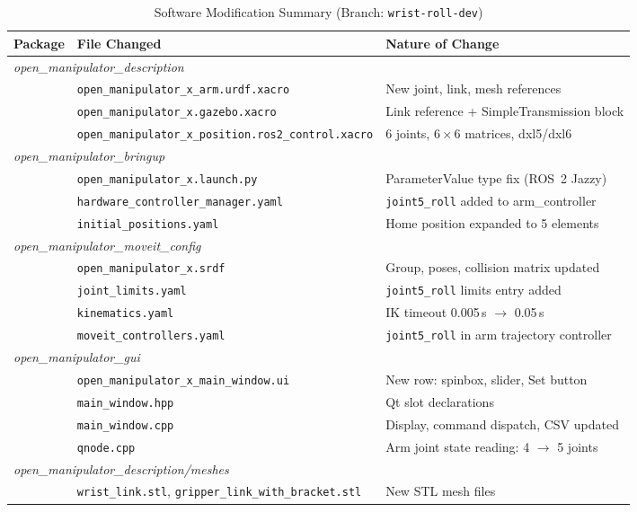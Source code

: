 \documentclass[conference]{IEEEtran}
\begin{document}
	\begin{table}[t]
		\centering
		\caption{Software Modification Summary (Branch: \texttt{wrist-roll-dev})}
		\label{tab:files}
		\renewcommand{\arraystretch}{1.2}
		\small
		\begin{tabular}{lll}
			\toprule
			\textbf{Package} & \textbf{File Changed} & \textbf{Nature of Change} \\
			\midrule
			\multicolumn{3}{l}{\textit{open\_manipulator\_description}} \\[2pt]
			& \texttt{open\_manipulator\_x\_arm.urdf.xacro}              & New joint, link, mesh references \\
			& \texttt{open\_manipulator\_x.gazebo.xacro}                 & Link reference + SimpleTransmission block \\
			& \texttt{open\_manipulator\_x\_position.ros2\_control.xacro} & 6 joints, $6\times6$ matrices, dxl5/dxl6 \\
			\midrule
			\multicolumn{3}{l}{\textit{open\_manipulator\_bringup}} \\[2pt]
			& \texttt{open\_manipulator\_x.launch.py}   & ParameterValue type fix (ROS~2 Jazzy) \\
			& \texttt{hardware\_controller\_manager.yaml} & \texttt{joint5\_roll} added to arm\_controller \\
			& \texttt{initial\_positions.yaml}           & Home position expanded to 5 elements \\
			\midrule
			\multicolumn{3}{l}{\textit{open\_manipulator\_moveit\_config}} \\[2pt]
			& \texttt{open\_manipulator\_x.srdf}         & Group, poses, collision matrix updated \\
			& \texttt{joint\_limits.yaml}                & \texttt{joint5\_roll} limits entry added \\
			& \texttt{kinematics.yaml}                   & IK timeout 0.005\,s $\rightarrow$ 0.05\,s \\
			& \texttt{moveit\_controllers.yaml}          & \texttt{joint5\_roll} in arm trajectory controller \\
			\midrule
			\multicolumn{3}{l}{\textit{open\_manipulator\_gui}} \\[2pt]
			& \texttt{open\_manipulator\_x\_main\_window.ui} & New row: spinbox, slider, Set button \\
			& \texttt{main\_window.hpp}                   & Qt slot declarations \\
			& \texttt{main\_window.cpp}                   & Display, command dispatch, CSV updated \\
			& \texttt{qnode.cpp}                          & Arm joint state reading: 4 $\rightarrow$ 5 joints \\
			\midrule
			\multicolumn{3}{l}{\textit{open\_manipulator\_description/meshes}} \\[2pt]
			& \texttt{wrist\_link.stl}, \texttt{gripper\_link\_with\_bracket.stl} & New STL mesh files \\
			\bottomrule
		\end{tabular}
	\end{table}
	
\end{document}
